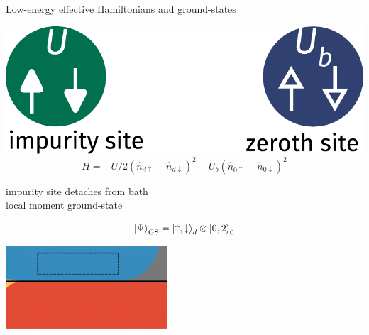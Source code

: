 \documentclass[8pt,aspectratio=169]{beamer}
\begin{document}
\begin{frame}{Low-energy effective Hamiltonians and ground-states}
{{\begin{minipage}{0.4\textwidth}
\includegraphics[width=\textwidth]{local-moment.pdf}
\[H = - U/2\left( \hat n_{d \uparrow} - \hat n_{d \downarrow} \right)^2 - U_b\left( \hat n_{0 \uparrow} - \hat n_{0 \downarrow} \right)^2\]
\end{minipage}
\hspace*{\fill}
\begin{minipage}{0.45\textwidth}
\vspace*{\fill}
\begin{enumerate}
\nitem impurity site detaches from bath\\[6pt]
\nitem \alert{local moment} ground-state\\[10pt]
\end{enumerate}
\[\ket{\Psi}_\text{GS} = \ket{\uparrow,\downarrow}_d\otimes\ket{0,2}_0 \]
\end{minipage}
}

\vspace*{\fill}

\includegraphics[width=0.45\textwidth]{phase-map-MIT3.pdf}
}

\end{frame}
\end{document}
